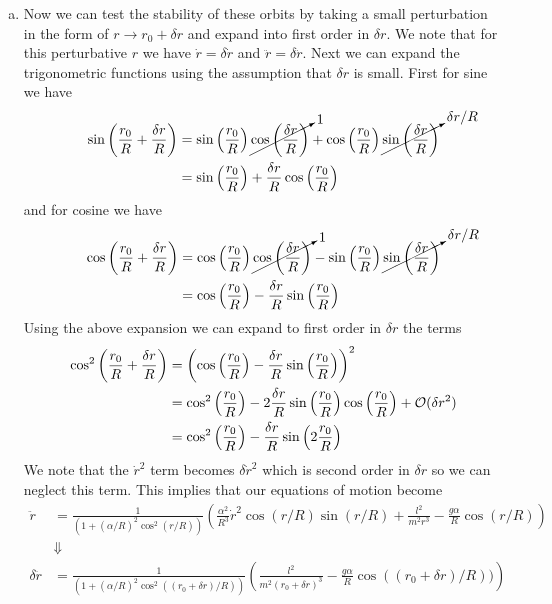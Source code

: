 \documentclass[11pt]{article}
\numberwithin{equation}{section}
\begin{document}
\begin{enumerate}[(a)]
\item Now we can test the stability of these orbits by taking a small perturbation in the 
form of $r\rightarrow r_0+\delta r$ and expand into first order in $\delta r$. We note that 
for this perturbative $r$ we have $\dot{r} = \delta\dot{r}$ and $\ddot{r} = \delta\ddot{r}$.
Next we can expand the trigonometric functions using the assumption that $\delta r$ is 
small. First for sine we have
\begin{align*}
\sin\left(\frac{r_0}{R}+\frac{\delta r}{R}\right) &= \sin\left(\frac{r_0}{R}\right)\cancelto{1}{\cos\left(\frac{\delta r}{R}\right)} + \cos\left(\frac{r_0}{R}\right)\cancelto{\delta r/R}{\sin\left(\frac{\delta r}{R}\right)}\\
&= \sin\left(\frac{r_0}{R}\right) + \frac{\delta r}{R}\cos\left(\frac{r_0}{R}\right)
\end{align*}
and for cosine we have
\begin{align*}
\cos\left(\frac{r_0}{R}+\frac{\delta r}{R}\right) &= \cos\left(\frac{r_0}{R}\right)\cancelto{1}{\cos\left(\frac{\delta r}{R}\right)} - \sin\left(\frac{r_0}{R}\right)\cancelto{\delta r/R}{\sin\left(\frac{\delta r}{R}\right)}\\
&= \cos\left(\frac{r_0}{R}\right) - \frac{\delta r}{R}\sin\left(\frac{r_0}{R}\right)
\end{align*}
Using the above expansion we can expand to first order in $\delta r$ the terms
\begin{align*}
\cos^2\left(\frac{r_0}{R}+\frac{\delta r}{R}\right) &=  \left(\cos\left(\frac{r_0}{R}\right) - \frac{\delta r}{R}\sin\left(\frac{r_0}{R}\right)\right)^2\\
&=  \cos^2\left(\frac{r_0}{R}\right) - 2\frac{\delta r}{R}\sin\left(\frac{r_0}{R}\right)\cos\left(\frac{r_0}{R}\right) + \mathcal{O}(\delta r^2)\\
&=  \cos^2\left(\frac{r_0}{R}\right) - \frac{\delta r}{R}\sin\left(2\frac{r_0}{R}\right)
\end{align*}
We note that the $\dot{r}^2$ term becomes $\delta\dot{r}^2$ which is second order in 
$\delta{r}$ so we can neglect this term. This implies that our equations of motion become
\begin{align*}
\ddot{r} &= \frac{1}{\left(1 + \left(\alpha/R\right)^2\cos^2(r/R)\right)}\left(\frac{\alpha^2}{R^3}\dot{r}^2\cos(r/R)\sin(r/R) + \frac{l^2}{m^2r^3} - \frac{g\alpha}{R}\cos(r/R)\right)\\
&\Downarrow\\
\delta\ddot{r} &= \frac{1}{\left(1 + \left(\alpha/R\right)^2\cos^2((r_0+\delta{r})/R)\right)}\left(\frac{l^2}{m^2(r_0+\delta{r})^3} - \frac{g\alpha}{R}\cos((r_0+\delta{r})/R))\right)\\

\end{align*}
\end{enumerate}
\end{document}

